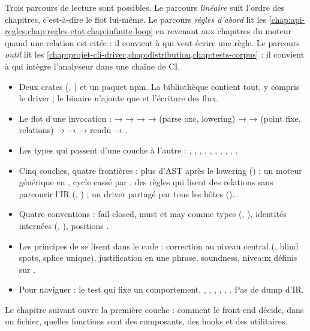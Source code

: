 Trois parcours de lecture sont possibles. Le parcours \emph{linéaire} suit l'ordre des chapitres, c'est-à-dire le flot lui-même. Le parcours \emph{règles d'abord} lit les \cref{chap:api-regles,chap:regles-etat,chap:infinite-loop} en revenant aux chapitres du moteur quand une relation est citée : il convient à qui veut écrire une règle. Le parcours \emph{outil} lit les \cref{chap:projet-cli-driver,chap:distribution,chap:tests-corpus} : il convient à qui intègre l'analyseur dans une chaîne de CI.

\begin{resume}
\begin{itemize}
  \item Deux crates (, ) et un paquet npm. La bibliothèque contient tout, y compris le driver ; le binaire n'ajoute que  et l'écriture des flux.
  \item Le flot d'une invocation :  →  →  →  →  (parse oxc, lowering) →  →  (point fixe, relations) →  →  → rendu → .
  \item Les types qui passent d'une couche à l'autre : , , , , , , , , , .
  \item Cinq couches, quatre frontières : plus d'AST après le lowering () ; un moteur générique en , cycle cassé par  ; des règles qui lisent des relations sans parcourir l'IR (, ) ; un driver partagé par tous les hôtes ().
  \item Quatre conventions : fail-closed, must et may comme types (, ), identités internées (, ), positions .
  \item Les principes de  se lisent dans le code : correction au niveau central (, blind spots, splice unique), justification en une phrase, soundness, niveaux définis sur .
  \item Pour naviguer : le test qui fixe un comportement, , , , , , . Pas de dump d'IR.
\end{itemize}
Le chapitre suivant ouvre la première couche : comment le front-end décide, dans un fichier, quelles fonctions sont des composants, des hooks et des utilitaires.
\end{resume}

